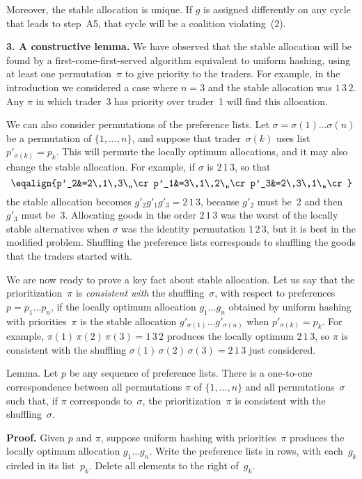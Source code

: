 Moreover, the stable allocation is unique. If $g$ is assigned differently on
any cycle that leads to step~A5, that cycle will be a coalition violating~(2).

\meno
{\bf 3. A constructive lemma.}
We have observed that the stable allocation will be found by a
first-come-first-served algorithm equivalent to uniform hashing, using at least
one permutation~$\pi$ to give priority to the traders. 
For example, in the introduction we considered a case where $n=3$ and the
stable allocation was $1\,3\,2$. Any $\pi$ in which trader~3 has priority over
trader~1 will find this allocation.

We can also consider permutations of the preference lists. Let
$\sigma=\sigma(1)\ldots\sigma(n)$ be a permutation of $\{1,\ldots,n\}$, and
suppose that trader~$\sigma(k)$ uses list $p'_{\sigma(k)}=p_k$. This will
permute the locally optimum allocations, and it may also change the stable
allocation. For example, if $\sigma$ is $2\,1\,3$, so that
$$\eqalign{p'_2&=2\,1\,3\,,\cr
p'_1&=3\,1\,2\,,\cr
p'_3&=2\,3\,1\,,\cr}$$
the stable allocation becomes $g'_2g'_1g'_3=2\,1\,3$, because $g'_2$ must be~2
and then $g'_3$ must be~3. Allocating goods in the order $2\,1\,3$ was the
worst of the locally stable alternatives when $\sigma$ was the identity
permutation $1\,2\,3$, but it is best in the modified problem. Shuffling the
preference lists corresponds to shuffling the goods that the traders started
with.

We are now ready to prove a key fact about stable allocation. Let us say
that the prioritization~$\pi$ is {\it consistent with\/} the
shuffling~$\sigma$, 
with respect to preferences $p=p_1\ldots p_n$,
 if the locally optimum allocation
$g_1\ldots g_n$ obtained by uniform hashing with priorities~$\pi$ is the stable
allocation $g'_{\sigma(1)}\ldots g'_{\sigma(n)}$ when $p'_{\sigma(k)}=p_k$. For
example, $\pi(1)\,\pi(2)\,\pi(3)=1\,3\,2$ produces the locally optimum
$2\,1\,3$, so $\pi$ is consistent with the shuffling $\sigma(1)\,\sigma(2)\,
\sigma(3)=2\,1\,3$ just considered.

\proclaim
Lemma. Let $p$ be any sequence of preference lists. There is a one-to-one
correspondence between all permutations $\pi$ of $\{1,\ldots,n\}$ and all
permutations~$\sigma$ such that, if $\pi$ corresponds to~$\sigma$, the
prioritization~$\pi$ is consistent with the shuffling~$\sigma$.

\meno
{\bf Proof.}
Given $p$ and $\pi$, suppose uniform hashing with priorities~$\pi$ produces the
locally optimum allocation $g_1\ldots g_n$. Write the preference lists in rows,
with each~$g_k$ circled in its list~$p_k$. Delete all elements to the right
of~$g_k$.

